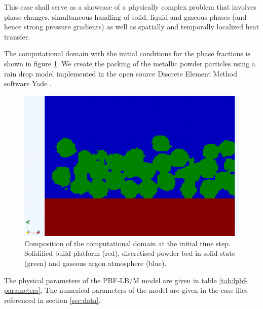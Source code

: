 \documentclass[conference,final]{IEEEtran}
\begin{document}
This case shall serve as a showcase of a physically complex problem that involves phase changes, simultaneous handling of solid, liquid and gaseous phases (and hence strong pressure gradients) as well as spatially and temporally localized heat transfer.

The computational domain with the initial conditions for the phase fractions is shown in figure \ref{fig:lpbf-initial}. We create the packing of the metallic powder particles using a rain drop model implemented in the open source Discrete Element Method software Yade \cite{vaclavsmilauerYadeDocumentation2021}.

\begin{figure}[!tbp]
  \centering
  \includegraphics[width=\linewidth]{Figs/powderbed.png}
  \caption{Composition of the computational domain at the initial time step. Solidified build platform (red), discretised powder bed in solid state (green) and gaseous argon atmosphere (blue).}
  \label{fig:lpbf-initial}
\end{figure}


The physical parameters of the PBF-LB/M model are given in table \ref{tab:lpbf-parameters}. The numerical parameters of the model are given in the case files referenced in section \ref{sec:data}.
\end{document}

